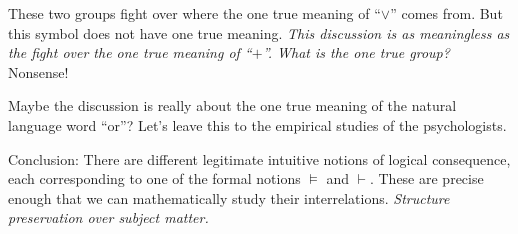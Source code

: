 \documentclass[a4paper]{article}
\begin{document}
These two groups fight over where the one true meaning of ``$\vee$'' comes from.
But this symbol does not have one true meaning.  \emph{This discussion is as
meaningless as the fight over the one true meaning of ``$+$''. What is the one
true group?} Nonsense!

Maybe the discussion is really about the one true meaning of the natural
language word ``or''?  Let's leave this to the empirical studies of the
psychologists.

Conclusion:  There are different legitimate intuitive notions of logical
consequence, each corresponding to one of the formal notions $\models$ and
$\vdash$.  These are precise enough that we can mathematically study their
interrelations.  \emph{Structure preservation over subject matter.}




\end{document}

